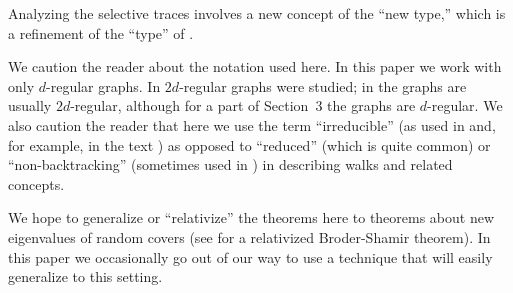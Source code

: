 \documentclass[12pt]{article}
\begin{document}
Analyzing the selective traces involves a new concept of the
``new type,'' which is a refinement of the ``type'' of 
\cite{friedman_random_graphs}.

We caution the reader about the notation used here.  In this paper
we work with only $d$-regular graphs.  In
\cite{broder} $2d$-regular graphs were studied; in 
\cite{friedman_random_graphs} the graphs are usually $2d$-regular, although
for a part of Section~3 the graphs are $d$-regular.
We also caution the reader that here we use the term ``irreducible''
(as used in \cite{broder,friedman_random_graphs} and, for example,
in the text \cite{godsil}) as opposed to ``reduced'' (which is quite
common) or
``non-backtracking'' (sometimes used in \cite{friedman_random_graphs})
in describing walks and related concepts.


We hope to generalize or
``relativize'' the theorems here to
theorems about new eigenvalues of random covers
(see \cite{friedman_relative} for a relativized Broder-Shamir theorem).  
In this paper we occasionally go out of our
way to use a technique that will easily generalize to this setting.
\end{document}
